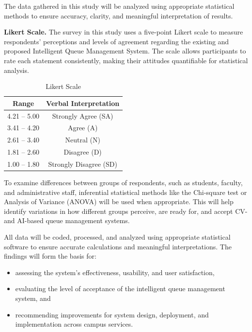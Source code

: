 \documentclass{research}
\begin{document}
\indent The data gathered in this study will be analyzed using appropriate statistical methods to ensure accuracy, clarity, and meaningful interpretation of results.

\indent\textbf{Likert Scale.} The survey in this study uses a five-point Likert scale to measure respondents' perceptions and levels of agreement regarding the existing and proposed Intelligent Queue Management System. The scale allows participants to rate each statement consistently, making their attitudes quantifiable for statistical analysis.

\begin{table}[h]
    \centering
    \caption{Likert Scale}
    \begin{tabular}{|c|c|}
        \hline
        \textbf{Range} & \textbf{Verbal Interpretation} \\
        \hline
        4.21 -- 5.00 & Strongly Agree (SA) \\
        \hline
        3.41 -- 4.20 & Agree (A) \\
        \hline
        2.61 -- 3.40 & Neutral (N) \\
        \hline
        1.81 -- 2.60 & Disagree (D) \\
        \hline
        1.00 -- 1.80 & Strongly Disagree (SD) \\
        \hline
    \end{tabular}
\end{table}

\indent To examine differences between groups of respondents, such as students, faculty, and administrative staff, inferential statistical methods like the Chi-square test or Analysis of Variance (ANOVA) will be used when appropriate. This will help identify variations in how different groups perceive, are ready for, and accept CV- and AI-based queue management systems.

\indent All data will be coded, processed, and analyzed using appropriate statistical software to ensure accurate calculations and meaningful interpretations. The findings will form the basis for:

\begin{itemize}
    \item assessing the system's effectiveness, usability, and user satisfaction,
    \item evaluating the level of acceptance of the intelligent queue management system, and
    \item recommending improvements for system design, deployment, and implementation across campus services.
\end{itemize}
\end{document}
